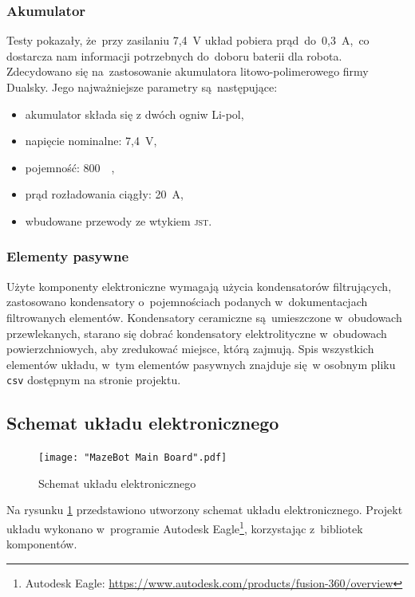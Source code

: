 \documentclass[11pt]{article}
\begin{document}
\subsubsection{Akumulator}
Testy pokazały, że~przy zasilaniu 7,4~\si{\volt} układ pobiera prąd~do~0,3~\si{\ampere},~co dostarcza nam informacji potrzebnych do~doboru baterii dla robota.
Zdecydowano się na~zastosowanie akumulatora litowo-polimerowego firmy Dualsky.
Jego najważniejsze parametry są~następujące:
\begin{itemize}
	\item akumulator składa się z dwóch ogniw Li-pol,
	\item napięcie nominalne: 7,4~\si{\volt},
	\item pojemność: 800~\si{\milli\amperehour},
	\item prąd rozładowania ciągły: 20~\si{\ampere},
	\item wbudowane przewody ze wtykiem \textsc{jst}.
\end{itemize}

\subsubsection{Elementy pasywne}
Użyte komponenty elektroniczne wymagają użycia kondensatorów filtrujących, zastosowano kondensatory o~pojemnościach podanych w~dokumentacjach filtrowanych elementów.
Kondensatory ceramiczne są~umieszczone w~obudowach przewlekanych, starano się dobrać kondensatory elektrolityczne w~obudowach powierzchniowych, aby zredukować miejsce, którą zajmują.
Spis wszystkich elementów układu, w~tym elementów pasywnych znajduje się~w osobnym pliku \texttt{csv} dostępnym na stronie projektu.
\subsection{Schemat układu elektronicznego}
\label{sec:schem}

\begin{figure}
		\centering
		\texttt{[image: "MazeBot Main Board".pdf]}
		\caption{Schemat układu elektronicznego}
		\label{fig:sch_eletr}
\end{figure}

Na rysunku \ref{fig:sch_eletr} przedstawiono utworzony schemat układu elektronicznego.
Projekt układu wykonano w~programie Autodesk Eagle\footnote{Autodesk Eagle: \url{https://www.autodesk.com/products/fusion-360/overview}}, korzystając z~bibliotek komponentów. 
\end{document}
